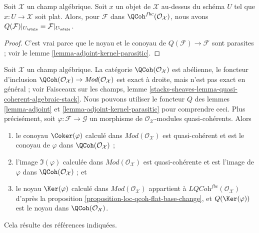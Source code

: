 \begin{lemma}
\label{lemma-flat-object-and-Q}
Soit $\mathcal{X}$ un champ algébrique. Soit $x$ un objet de $\mathcal{X}$
au-dessus du schéma $U$ tel que $x : U \to \mathcal{X}$ soit plat.
Alors, pour $\mathcal{F}$ dans $\QCoh^{fbc}(\mathcal{O}_\mathcal{X})$,
nous avons $Q(\mathcal{F})|_{U_\etale} = \mathcal{F}|_{U_\etale}$.
\end{lemma}

\begin{proof}
C'est vrai parce que le noyau et le conoyau de $Q(\mathcal{F}) \to \mathcal{F}$
sont parasites ; voir le lemme \ref{lemma-adjoint-kernel-parasitic}.
\end{proof}

\begin{remark}
\label{remark-QCoh-abelian}
Soit $\mathcal{X}$ un champ algébrique. La catégorie
$\QCoh(\mathcal{O}_\mathcal{X})$ est abélienne, le foncteur d'inclusion
$\QCoh(\mathcal{O}_\mathcal{X}) \to \textit{Mod}(\mathcal{O}_\mathcal{X})$
est exact à droite, mais n'est pas exact en général ; voir Faisceaux sur les champs, lemme
\ref{stacks-sheaves-lemma-quasi-coherent-algebraic-stack}.
Nous pouvons utiliser le foncteur $Q$ des
lemmes \ref{lemma-adjoint} et \ref{lemma-adjoint-kernel-parasitic}
pour comprendre ceci. Plus précisément, soit $\varphi : \mathcal{F} \to \mathcal{G}$
un morphisme de $\mathcal{O}_\mathcal{X}$-modules quasi-cohérents. Alors
\begin{enumerate}
\item le conoyau $\Coker(\varphi)$ calculé dans
$\textit{Mod}(\mathcal{O}_\mathcal{X})$ est quasi-cohérent et
est le conoyau de $\varphi$ dans $\QCoh(\mathcal{O}_\mathcal{X})$ ;
\item l'image $\Im(\varphi)$ calculée dans
$\textit{Mod}(\mathcal{O}_\mathcal{X})$ est quasi-cohérente et
est l'image de $\varphi$ dans $\QCoh(\mathcal{O}_\mathcal{X})$ ; et
\item le noyau $\Ker(\varphi)$ calculé dans
$\textit{Mod}(\mathcal{O}_\mathcal{X})$
appartient à $\textit{LQCoh}^{fbc}(\mathcal{O}_\mathcal{X})$
d'après la proposition \ref{proposition-loc-qcoh-flat-base-change}, et
$Q(\Ker(\varphi))$ est le noyau dans $\QCoh(\mathcal{O}_\mathcal{X})$.
\end{enumerate}
Cela résulte des références indiquées.
\end{remark}

